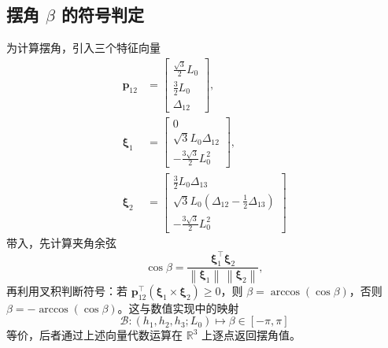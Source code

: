 \documentclass[12pt,a4paper]{article}
\begin{document}
\subsection{摆角 $\beta$ 的符号判定}
为计算摆角，引入三个特征向量
\begin{align}
  \bm p_{12} &= \begin{bmatrix}\frac{\sqrt{3}}{2}L_0\\ \frac{3}{2} L_0\\ \Delta_{12} \end{bmatrix},\\
  \bm \xi_1 &= \begin{bmatrix} 0\\ \sqrt{3} L_0 \Delta_{12}\\ -\frac{3\sqrt{3}}{2} L_0^2 \end{bmatrix},\\
  \bm \xi_2 &= \begin{bmatrix} \frac{3}{2} L_0 \Delta_{13}\\ \sqrt{3} L_0 (\Delta_{12} - \frac{1}{2}\Delta_{13})\\ -\frac{3\sqrt{3}}{2} L_0^2 \end{bmatrix}
\end{align}
带入，先计算夹角余弦
\begin{equation}
  \cos\beta = \frac{\bm \xi_1^\top \bm \xi_2}{\left\lVert \bm \xi_1 \right\rVert\,\left\lVert \bm \xi_2 \right\rVert},
\end{equation}
再利用叉积判断符号：若 $\bm p_{12}^\top(\bm \xi_1 \times \bm \xi_2) \geq 0$，则 $\beta = \arccos(\cos\beta)$，否则 $\beta = -\arccos(\cos\beta)$。这与数值实现中的映射
\begin{equation}
  \mathscr{B} : (h_1,h_2,h_3;L_0) \longmapsto \beta \in [-\pi,\pi]
\end{equation}
等价，后者通过上述向量代数运算在 $\mathbb{R}^3$ 上逐点返回摆角值。
\end{document}
